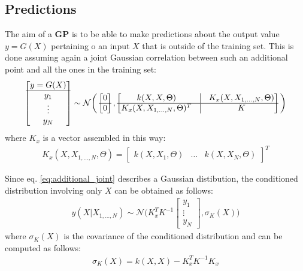 \documentclass{article}
\begin{document}
\subsection{Predictions}
\label{sec:predictions_scalar}

The aim of a \textbf{GP} is to be able to make predictions about the output value $y = G(X)$ pertaining o an input $X$ that is outside of the training set. This is done assuming again a joint Gaussian correlation between such an additional point and all the ones in the training set: 
\begin{eqnarray}
\begin{bmatrix} y = G(X) \\ \hline y_1 \\ \vdots \\ y_N \end{bmatrix} \sim \mathcal{N} 
\bigg (
\begin{bmatrix} 0 \\ \hline 0 \end{bmatrix},
\begin{bmatrix}
k(X,X, \Theta) & \vline & K_x(X, X_{1,\hdots,N}, \Theta) \\ 
\hline
K_x(X, X_{1,\hdots,N}, \Theta)^T & \vline & K
\end{bmatrix}
\bigg )
\end{eqnarray}
where $K_x$ is a vector assembled in this way:
\begin{eqnarray}
K_x(X, X_{1,\hdots,N}, \Theta) = \begin{bmatrix}
k(X, X_1 , \Theta) & \hdots & k(X, X_N , \Theta)
\end{bmatrix}^T
\label{eq:additional_joint}
\end{eqnarray}

Since eq. \ref{eq:additional_joint} describes a Gaussian distibution, the conditioned distribution involving only $X$ can be obtained as follows:
\begin{eqnarray}
y(X | X_{1,\hdots,N}) 
\sim \mathcal{N} \bigg ( 
K_x^T K^{-1} \begin{bmatrix} y_1 \\ \vdots \\ y_N \end{bmatrix} , 
\sigma_K(X)
\bigg )  
\label{eq:scalar_prediction}
\end{eqnarray}
where $\sigma_K(X)$ is the covariance of the conditioned distribution and can be computed as follows:
\begin{eqnarray}
\sigma_K(X) =
k(X,X) - K_x^T K^{-1} K_x
\end{eqnarray}
\end{document}
